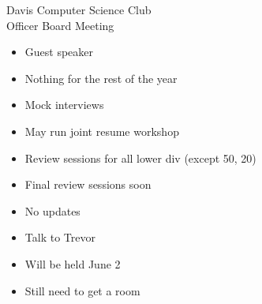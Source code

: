 \documentclass{article}
\begin{document}
\begin{Minutes}{Davis Computer Science Club\\Officer Board Meeting}
\begin{itemize}
  \item Guest speaker
\end{itemize}


\begin {itemize} 
  \item Nothing for the rest of the year
\end {itemize}

\begin {itemize}
  \item Mock interviews
  \item May run joint resume workshop
\end {itemize}

\begin{itemize}
  \item Review sessions for all lower div (except 50, 20)
  \item Final review sessions soon
\end {itemize}

\begin {itemize}
  \item No updates
\end {itemize}

\begin {itemize}
  \item Talk to Trevor
  \item Will be held June 2
  \item Still need to get a room
\end {itemize}

\end{Minutes}
\thispagestyle{creditfooter}
\end{document}
